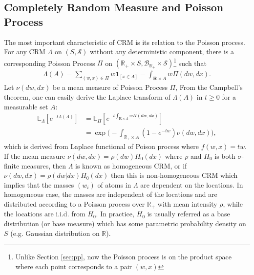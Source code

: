 \documentclass{article}
\begin{document}
\subsection{Completely Random Measure and Poisson Process}
The most important characteristic of CRM is its relation to the Poisson process. For any CRM $\Lambda$ on $(S, \mathcal{S})$ without any deterministic component, there is a corresponding Poisson Process $\Pi$ on $(\mathbb{R}_+ \times S, \mathcal{B}_{\mathbb{R}_+} \times \mathcal{S})$\footnote{Unlike Section \ref{sec:pp}, now the Poisson process is on the product space where each point corresponds to a pair $(w, x)$} such that
\begin{align}
\Lambda(A) = \sum_{(w, x) \in \Pi}w \mathbf{1}_{[x \in A]} = \int_{\mathbf{R}\times A} w \Pi(dw, dx).
\end{align}
Let $\nu(dw, dx)$ be a mean measure of Poisson Process $\Pi$, From the Campbell's theorem, one can easily derive the Laplace transform of $\Lambda(A)$ in $t\ge 0$ for a measurable set $A$:
\begin{align}
\mathbb{E}_\Lambda[e^{-t\Lambda(A)}] &= \mathbb{E}_{\Pi}[e^{-t \int_{\mathbf{R}\times A} w \Pi(dw, dx) }] \\
& = \exp\Bigg( - \int_{\mathbb{R}_+ \times A} (1- e^{-tw}) \nu(dw,dx) \Bigg),
\end{align}
which is derived from Laplace functional of Poison process where $f(w, x) = tw$.
If the mean measure $\nu(dw, dx) = \rho(dw)H_0(dx)$ where $\rho$ and $H_0$ is both $\sigma$-finite measures, then $\Lambda$ is known as homogeneous CRM, or if $\nu(dw, dx) = \rho(dw|dx)H_0(dx)$ then this is non-homogeneous CRM which implies that the masses $(w_i)$ of atoms in $\Lambda$ are dependent on the locations. In homogeneous case, the masses are independent of the locations and are distributed according to a Poisson process over $\mathbb{R}_+$ with mean intensity $\rho$, while the locations are i.i.d. from $H_0$. In practice, $H_0$ is usually referred as a base distribution (or base measure) which has some parametric probability density on $S$ (e.g. Gaussian distribution on $\mathbb{R}$).
\end{document}
